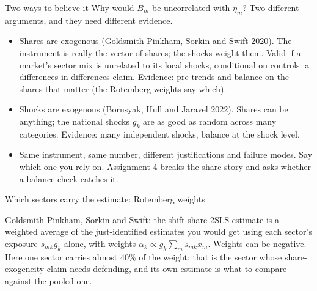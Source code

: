 \documentclass[aspectratio=169,11pt]{beamer}
\begin{document}
\begin{frame}{Two ways to believe it}
Why would $B_m$ be uncorrelated with $\eta_m$? Two different arguments, and they need different evidence.
\begin{itemize}
	\item \alert{Shares are exogenous} (Goldsmith-Pinkham, Sorkin and Swift 2020). The instrument is really the
	vector of shares; the shocks weight them. Valid if a market's sector mix is unrelated to its local shocks,
	conditional on controls: a differences-in-differences claim. Evidence: pre-trends and balance on the shares
	that matter (the Rotemberg weights say which).
	\item \alert{Shocks are exogenous} (Borusyak, Hull and Jaravel 2022). Shares can be anything; the national
	shocks $g_k$ are as good as random across many categories. Evidence: many independent shocks, balance at the
	shock level.
	\item Same instrument, same number, different justifications and failure modes. Say which one you rely on.
	Assignment 4 breaks the share story and asks whether a balance check catches it.
\end{itemize}
\end{frame}


\begin{frame}{Which sectors carry the estimate: Rotemberg weights}
\begin{center}
\small

\end{center}
\vspace{-.2cm}
{\small Goldsmith-Pinkham, Sorkin and Swift: the shift-share 2SLS estimate is a weighted average of the
just-identified estimates you would get using each sector's exposure $s_{mk} g_k$ alone, with weights
$\alpha_k \propto g_k \sum_m s_{mk}\tilde x_m$. Weights can be negative. Here one sector carries almost 40\% of the weight; that is the sector whose share-exogeneity claim needs defending, and its own estimate is what
to compare against the pooled one.}
\end{frame}
\end{document}
